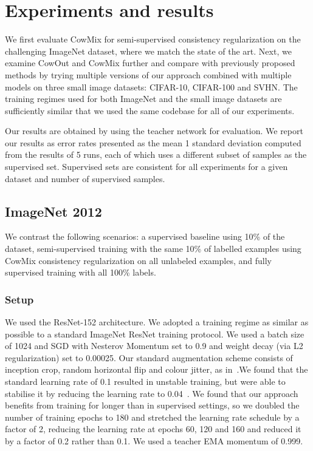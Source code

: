 \documentclass{article}
\begin{document}
\section{Experiments and results}
\label{sec:experiments}
We first evaluate CowMix for semi-supervised consistency regularization on the challenging ImageNet dataset, where we match the state of the art. Next, we examine CowOut and CowMix further and compare with previously proposed methods by trying multiple versions of our approach combined with multiple models on three small image datasets: CIFAR-10, CIFAR-100 and SVHN. The training regimes used for both ImageNet and the small image datasets are sufficiently similar that we used the same codebase for all of our experiments.

Our results are obtained by using the teacher network for evaluation. We report our results as error rates presented
as the mean  1 standard deviation computed from the results of 5 runs, each of which uses a different subset of samples as the supervised set. Supervised sets are consistent for all experiments for a given dataset and number of supervised samples.



\subsection{ImageNet 2012}

We contrast the following scenarios: a supervised baseline using 10\% of the dataset, semi-supervised training with the same 10\% of labelled examples using CowMix consistency regularization on all unlabeled examples, and fully supervised training with all 100\% labels. 


\subsubsection{Setup}

We used the ResNet-152 architecture. We adopted a training regime as similar as possible to a standard ImageNet ResNet training protocol.
We used a batch size of 1024 and SGD with Nesterov Momentum \cite{Sutskever:Momentum} set to 0.9 and weight decay (via L2 regularization) set to 0.00025. Our standard augmentation scheme consists of inception crop, random horizontal flip and colour jitter, as in~\cite{Tarvainen:MeanTeachers}.We found that the standard learning rate of 0.1 resulted in unstable training, but were able to stabilise it by reducing the learning rate to 0.04~\cite{Tarvainen:MeanTeachers}. We found that our approach benefits from training for longer than in supervised settings, so we doubled the number of training epochs to 180 and stretched the learning rate schedule by a factor of 2, reducing the learning rate at epochs 60, 120 and 160 and reduced it by a factor of 0.2 rather than 0.1. We used a teacher EMA momentum  of 0.999.
\end{document}
